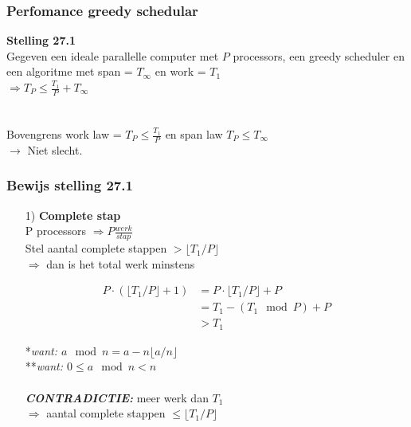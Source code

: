 \documentclass
   [kulak] %
   {kulakbeamer}
\begin{document}
\begin{frame}
	\frametitle{Perfomance greedy schedular}
	\textbf{Stelling 27.1}\\
	Gegeven een ideale parallelle computer met $P$ processors, een greedy scheduler en een algoritme met span = $T_\infty$ en work = $T_1$\\
	$\Rightarrow T_P \leqslant \frac{T_1}{P} + T_\infty$ \\~\\~\\
	Bovengrens work law = $T_P \leqslant \frac{T_1}{P}$ en span law $T_P \leqslant T_\infty$ \\
	$\rightarrow$ Niet slecht.
\end{frame}

\begin{frame}
	\frametitle{Bewijs stelling 27.1}
	\begin{itemize}
		\item [1)] \textbf{Complete stap}\\
		P processors $\Rightarrow P \frac{werk}{stap}$ \\
		Stel aantal complete stappen $> \lfloor T_1/P\rfloor$
		\pause \\
		$\Rightarrow$ dan is het total werk minstens
		
		
		\begin{equation} 
		\begin{split}
		P\cdot (\lfloor T_1 /P\rfloor + 1) & = P\cdot\lfloor T_1 /P\rfloor + P  \\
		& = T_1 - (T_1 \mod P) + P \\
		& > T_1  
		\end{split}
		\end{equation}
		
		*\textit{want: $a\mod n = a - n\lfloor a/n\rfloor$}\\
		**\textit{want:  $0 \leqslant a\mod n < n$} \\ ~ \\
		\pause
		\textbf{\textit{CONTRADICTIE:}} meer werk dan $T_1$\\$ \Rightarrow$ aantal complete stappen $\leqslant \lfloor T_1 /P\rfloor$ \\
		
	\end{itemize}
\end{frame}
\end{document}
